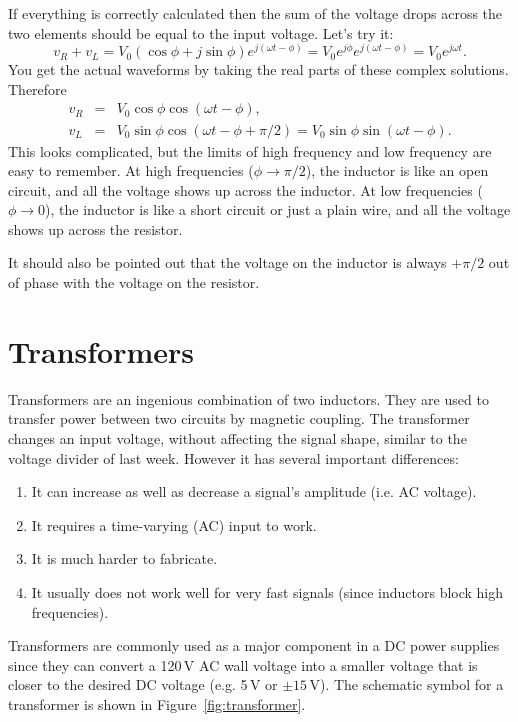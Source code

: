 \documentclass{article}
\begin{document}
If everything is correctly calculated then the sum of the voltage drops across the two elements should be equal to the input voltage. Let's try it:
\begin{equation}
v_R + v_L = V_0 \left( \cos\phi + j\sin\phi \right) e^{j(\omega t - \phi)} = V_0 e^{j\phi} e^{j(\omega t - \phi)} = V_0 e^{j\omega t}.
\end{equation}
You get the actual waveforms by taking the real parts of these complex solutions.
Therefore
\begin{eqnarray}
v_R & = & V_0 \cos\phi \cos(\omega t - \phi), \\
v_L & = & V_0 \sin\phi \cos(\omega t - \phi + \pi/2) = V_0 \sin\phi \sin(\omega t - \phi). 
\end{eqnarray}
This looks complicated, but the limits of high frequency and low frequency are easy to remember. At high frequencies ($\phi \to \pi/2$), the inductor is like an open circuit, and all the voltage shows up across the inductor. At low frequencies ($\phi \to 0$), the inductor is like a short circuit or just a plain wire, and all the voltage shows up across the resistor.

It should also be pointed out that the voltage on the inductor is always $+\pi/2$ out of phase with the voltage on the resistor.

\section{Transformers}
Transformers are an ingenious combination of two inductors. They are used to transfer power between two circuits by magnetic coupling. The transformer changes an input voltage, without affecting the signal shape, similar to the voltage divider of last week. However it has several important differences:
\begin{enumerate}
\item It can increase as well as decrease a signal's amplitude (i.e. AC voltage).
\item It requires a time-varying (AC) input to work.
\item It is much harder to fabricate.
\item It usually does not work well for very fast
signals (since inductors block high frequencies).
\end{enumerate}

Transformers are commonly used as a major component in a DC power supplies since they can convert a 120\,V AC wall voltage into a smaller voltage that is closer to the desired DC voltage (e.g. 5\,V or $\pm 15$\,V). The schematic symbol for a transformer is shown in Figure~\ref{fig:transformer}.
\end{document}
